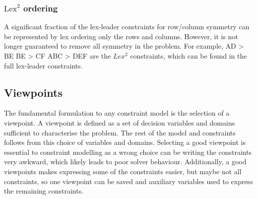 \documentclass[CS4402-Notes.tex]{subfiles}
\begin{document}
\subsubsection{$\text{Lex}^{2}$ ordering}
A significant fraction of the lex-leader constraints for row/column symmetry can be represented by lex ordering only the rows and columns. However, it is not longer guaranteed to remove all symmetry in the problem. For example,
AD > BE
BE > CF
ABC > DEF
are the $Lex^{2}$ constraints, which can be found in the full lex-leader constraints.



\subsection{Viewpoints}
The fundamental formulation to any constraint model is the selection of a viewpoint. A viewpoint is defined as a set of decision variables and domains sufficient to characterise the problem. The rest of the model and constraints follows from this choice of variables and domains.
\n
Selecting a good viewpoint is essential to constraint modelling as a wrong choice can be writing the constraints very awkward, which likely leads to poor solver behaviour. Additionally, a good viewpoints makes expressing some of the constraints easier, but maybe not all constraints, so one viewpoint can be saved and auxiliary variables used to express the remaining constraints.
\end{document}
